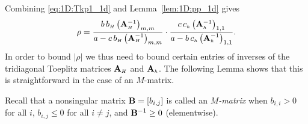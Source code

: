 Combining \eqref{eq:1D:Tkp1_1d} and Lemma~\ref{lem:1D:pp_1d} gives
%
\begin{equation}\label{eq:1D:rho}
\rho = \frac{b\, b_{\scriptscriptstyle H}  \left(\mathbf{A}_{\scriptscriptstyle H} ^{-1}\right)_{m,m} }{a -c\, b_{\scriptscriptstyle H}  \left(\mathbf{A}_{\scriptscriptstyle H} ^{-1}\right)_{m,m}}\cdot\frac{c\, c_{\scriptscriptstyle h} \left(\mathbf{A}_{\scriptscriptstyle h} ^{-1}\right)_{1,1}}{a - b\, c_{\scriptscriptstyle h} \left(\mathbf{A}_{\scriptscriptstyle h} ^{-1}\right)_{1,1}}.
\end{equation}
%
In order to bound $|\rho|$ we thus need to bound certain entries of inverses
of the tridiagonal Toeplitz matrices $\mathbf{A}_{\scriptscriptstyle H}$ and $\mathbf{A}_{\scriptscriptstyle h}$. The following
Lemma
shows that this is straightforward in the case of an $M$-matrix.

Recall that a nonsingular matrix $\mathbf{B}=[b_{i,j}]$ is called an \emph{$M$-matrix}
when $b_{i,i}>0$ for all $i$, $b_{i,j}\leq 0$ for all $i\neq j$, and
$\mathbf{B}^{-1}\geq 0$ (elementwise).

